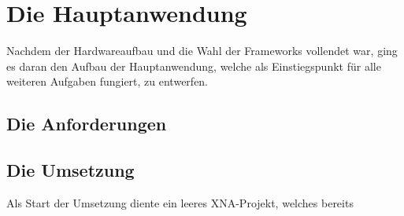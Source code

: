 \section{Die Hauptanwendung}
\begin{Spacing}{\mylinespace}

Nachdem der Hardwareaufbau und die Wahl der Frameworks vollendet war, ging es daran  den Aufbau der Hauptanwendung, welche als Einstiegspunkt für alle weiteren Aufgaben fungiert, zu entwerfen.

\subsection{Die Anforderungen}

\subsection{Die Umsetzung}
Als Start der Umsetzung diente ein leeres XNA-Projekt, welches bereits


\end{Spacing}
\newpage
\clearpage
